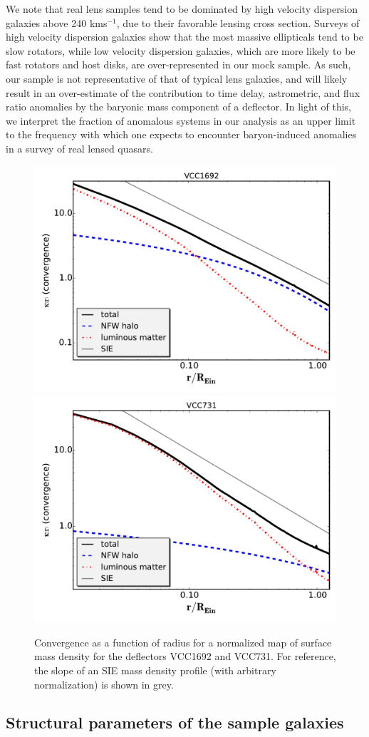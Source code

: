 We note that real lens samples tend to be dominated by high velocity dispersion galaxies above 240 kms$^{-1}$\cite{Auger++10,Son++13a}, due to their favorable lensing cross section. Surveys of high velocity dispersion galaxies \cite{Goulding++16} show that the most massive ellipticals tend to be slow rotators, while low velocity dispersion galaxies, which are more likely to be fast rotators and host disks, are over-represented in our mock sample. As such, our sample is not representative of that of typical lens galaxies, and will likely result in an over-estimate of the contribution to time delay, astrometric, and flux ratio anomalies by the baryonic mass component of a deflector. In light of this, we interpret the fraction of anomalous systems in our analysis as an upper limit to the frequency with which one expects to encounter baryon-induced anomalies in a survey of real lensed quasars.
\begin{figure}
	\centering
	{\includegraphics[trim=0.25cm 0.6cm 0cm
		0cm,clip,width=.48\textwidth]{./figures_sls/VCC1692r_vs_kap-eps-converted-to.pdf}}
	{\includegraphics[trim=0cm .6cm 0cm
		0cm,clip,width=.48\textwidth]{./figures_sls/VCC731r_vs_kap-eps-converted-to.pdf}}
	\caption[Convergence as a function of radius for VCC1692 and VCC731]{\label{fig:r_vs_kap}Convergence as a function of radius for a normalized map of surface mass density for the deflectors VCC1692 and VCC731. For reference, the slope of an SIE mass density profile (with arbitrary normalization) is shown in grey.}
\end{figure} 
\subsection{Structural parameters of the sample galaxies}
\label{sect:lenses}

